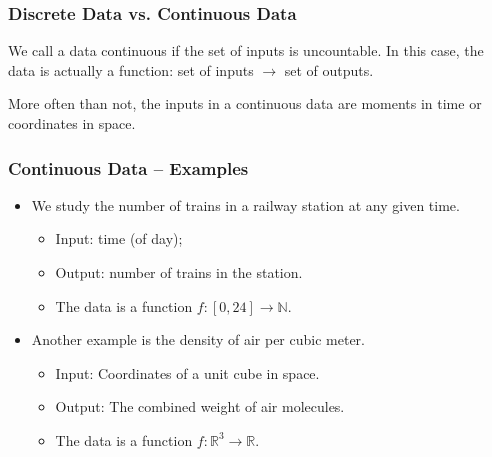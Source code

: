 \documentclass[aspectratio=169,11pt,svgnames]{beamer}
\begin{document}
\begin{frame}
 \frametitle{Discrete Data vs. Continuous Data}
 \begin{tcolorbox}[title=Continuous Data]
  We call a data \alert{continuous} if the set of inputs is \alert{uncountable}.
  In this case, the data is actually a \alert{function}: set of inputs $ \to $
  set of outputs.
 \end{tcolorbox}
 \pause
 More often than not, the inputs in a continuous data are \alert{moments in
 time} or \alert{coordinates in space}.
\end{frame}

\begin{frame}
 \frametitle{Continuous Data -- Examples}
 \begin{itemize}[label=\textbullet]
  \item We study the number of trains in a railway station at any given time.
  \pause
  \begin{itemize}[label=\textminus]
   \item Input: time (of day);
   \pause
   \item Output: number of trains in the station.
   \pause
   \item The data is a function $f:[0,24] \to \mathbb{N}$.
  \end{itemize}
 \pause
 \item Another example is the density of air per cubic meter.
 \pause
 \begin{itemize}[label=\textminus] 
  \item Input: Coordinates of a unit cube in space.
  \pause
  \item Output: The combined weight of air molecules.
  \pause
  \item The data is a function $f:\mathbb{R}^3 \to \mathbb{R}$. 
 \end{itemize}
 \end{itemize}
\end{frame}
\end{document}
